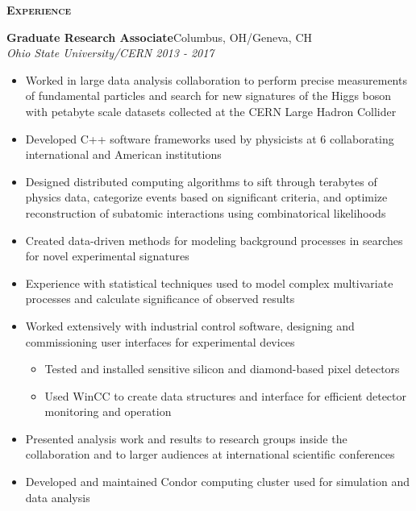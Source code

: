 \documentclass[line]{letter}
\begin{document}
{\vspace{5pt} \Large \textsc{\textbf{Experience}}}
\begin{addmargin}[1em]{1em}
{\large {\bf Graduate Research Associate}\hfill Columbus, OH/Geneva, CH\vspace{1mm}}\\
{\large \it Ohio State University/CERN \hfill  2013 - 2017} \\
\vspace{-6mm}
\begin{itemize}[leftmargin=5mm]
\item Worked in large data analysis collaboration to perform precise measurements of fundamental particles and search for new signatures of the Higgs boson with petabyte scale datasets collected at the CERN Large Hadron Collider
\item Developed C++ software frameworks used by physicists at 6 collaborating international and American institutions
\item Designed distributed computing algorithms to sift through terabytes of physics data, categorize events based on significant criteria, and optimize reconstruction of subatomic interactions using combinatorical likelihoods 
\item Created data-driven methods for modeling background processes in searches for novel experimental signatures 
\item Experience with statistical techniques used to model complex multivariate processes and calculate significance of observed results
\item Worked extensively with industrial control software, designing and commissioning user interfaces for experimental devices
\begin{itemize}
\item Tested and installed sensitive silicon and diamond-based pixel detectors
\item Used WinCC to create data structures and interface for efficient detector monitoring and operation
\end{itemize}%
\item Presented analysis work and results to research groups inside the collaboration and to larger audiences at international scientific conferences%
\item Developed and maintained Condor computing cluster used for simulation and data analysis
\end{itemize}
\vspace{1mm}


\end{addmargin}
\end{document}
